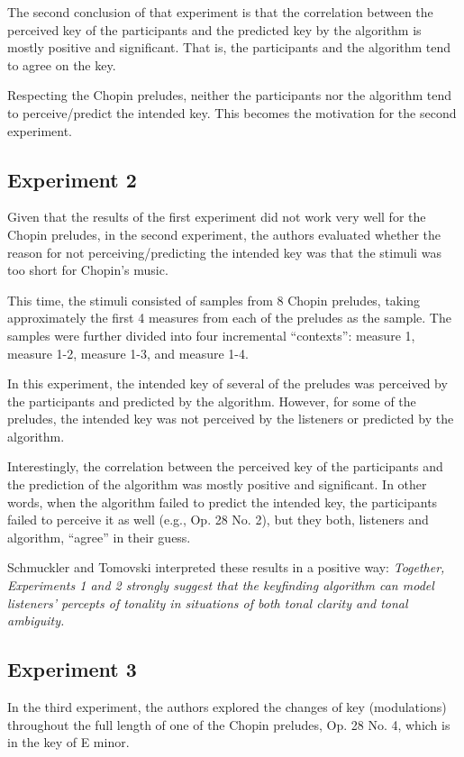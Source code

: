 The second conclusion of that experiment is that the correlation between the perceived key of the participants and the predicted key by the algorithm is mostly positive and significant. That is, the participants and the algorithm tend to agree on the key.

Respecting the Chopin preludes, neither the participants nor the algorithm tend to perceive/predict the intended key. This becomes the motivation for the second experiment.

\subsection{Experiment 2}

Given that the results of the first experiment did not work very well for the Chopin preludes, in the second experiment, the authors evaluated whether the reason for not perceiving/predicting the intended key was that the stimuli was too short for Chopin's music.

This time, the stimuli consisted of samples from 8 Chopin preludes, taking approximately the first 4 measures from each of the preludes as the sample. The samples were further divided into four incremental ``contexts'': measure 1, measure 1-2, measure 1-3, and measure 1-4.

In this experiment, the intended key of several of the preludes was perceived by the participants and predicted by the algorithm. However, for some of the preludes, the intended key was not perceived by the listeners or predicted by the algorithm. 

Interestingly, the correlation between the perceived key of the participants and the prediction of the algorithm was mostly positive and significant. In other words, when the algorithm failed to predict the intended key, the participants failed to perceive it as well (e.g., Op. 28 No. 2), but they both, listeners and algorithm, ``agree'' in their guess.

Schmuckler and Tomovski interpreted these results in a positive way: \emph{Together, Experiments 1 and 2 strongly suggest that the keyfinding algorithm can model listeners’ percepts of tonality in situations of both tonal clarity and tonal ambiguity.}

\subsection{Experiment 3}

In the third experiment, the authors explored the changes of key (modulations) throughout the full length of one of the Chopin preludes, Op. 28 No. 4, which is in the key of E minor.


